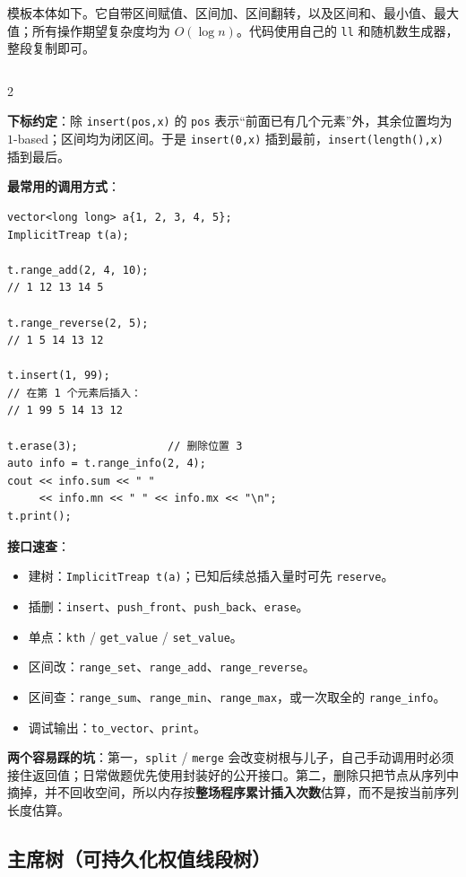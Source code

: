 	模板本体如下。它自带区间赋值、区间加、区间翻转，以及区间和、最小值、最大值；所有操作期望复杂度均为 $O(\log n)$。代码使用自己的 \verb|ll| 和随机数生成器，整段复制即可。

	\inputminted{cpp}{snippets/implicit_treap.cpp}

	\begin{multicols*}{2}

	\textbf{下标约定}：除 \verb|insert(pos,x)| 的 \verb|pos| 表示“前面已有几个元素”外，其余位置均为 $1$-based；区间均为闭区间。于是 \verb|insert(0,x)| 插到最前，\verb|insert(length(),x)| 插到最后。

	\textbf{最常用的调用方式}：

	\begin{verbatim}
vector<long long> a{1, 2, 3, 4, 5};
ImplicitTreap t(a);

t.range_add(2, 4, 10);
// 1 12 13 14 5

t.range_reverse(2, 5);
// 1 5 14 13 12

t.insert(1, 99);
// 在第 1 个元素后插入：
// 1 99 5 14 13 12

t.erase(3);              // 删除位置 3
auto info = t.range_info(2, 4);
cout << info.sum << " "
     << info.mn << " " << info.mx << "\n";
t.print();
	\end{verbatim}

	\textbf{接口速查}：

	\begin{itemize}
		\item 建树：\verb|ImplicitTreap t(a)|；已知后续总插入量时可先 \verb|reserve|。
		\item 插删：\verb|insert|、\verb|push_front|、\verb|push_back|、\verb|erase|。
		\item 单点：\verb|kth| / \verb|get_value| / \verb|set_value|。
		\item 区间改：\verb|range_set|、\verb|range_add|、\verb|range_reverse|。
		\item 区间查：\verb|range_sum|、\verb|range_min|、\verb|range_max|，或一次取全的 \verb|range_info|。
		\item 调试输出：\verb|to_vector|、\verb|print|。
	\end{itemize}

	\textbf{两个容易踩的坑}：第一，\verb|split| / \verb|merge| 会改变树根与儿子，自己手动调用时必须接住返回值；日常做题优先使用封装好的公开接口。第二，删除只把节点从序列中摘掉，并不回收空间，所以内存按\textbf{整场程序累计插入次数}估算，而不是按当前序列长度估算。

	\subsection{主席树（可持久化权值线段树）}


\end{multicols*}
